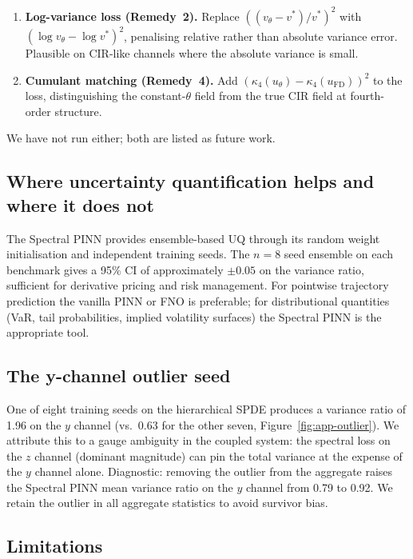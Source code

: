 \documentclass[review,12pt]{elsarticle}
\begin{document}
\begin{enumerate}
\item \textbf{Log-variance loss (Remedy~2).} Replace
\(((v_\theta - v^*)/v^*)^2\) with
\((\log v_\theta - \log v^*)^2\), penalising relative rather than
absolute variance error. Plausible on CIR-like channels where the
absolute variance is small.
\item \textbf{Cumulant matching (Remedy~4).} Add
\((\kappa_4(u_\theta) - \kappa_4(u_{\mathrm{FD}}))^2\) to the
loss, distinguishing the constant-\(\theta\) field from the true
CIR field at fourth-order structure.
\end{enumerate}

We have not run either; both are listed as future work.

\subsection{Where uncertainty quantification helps and where it does not}

The Spectral PINN provides ensemble-based UQ through its random weight initialisation and independent training seeds. The \(n=8\) seed ensemble on each benchmark gives a 95\% CI of approximately \(\pm 0.05\) on the variance ratio, sufficient for derivative pricing and risk management. For pointwise trajectory prediction the vanilla PINN or FNO is preferable; for distributional quantities (VaR, tail probabilities, implied volatility surfaces) the Spectral PINN is the appropriate tool.

\subsection{The y-channel outlier seed}

One of eight training seeds on the hierarchical SPDE produces a variance ratio of 1.96 on the \(y\) channel (vs.~0.63 for the other seven, Figure~\ref{fig:app-outlier}). We attribute this to a gauge ambiguity in the coupled system: the spectral loss on the \(z\) channel (dominant magnitude) can pin the total variance at the expense of the \(y\) channel alone. Diagnostic: removing the outlier from the aggregate raises the Spectral PINN mean variance ratio on the \(y\) channel from 0.79 to 0.92. We retain the outlier in all aggregate statistics to avoid survivor bias.

\subsection{Limitations}
\end{document}
